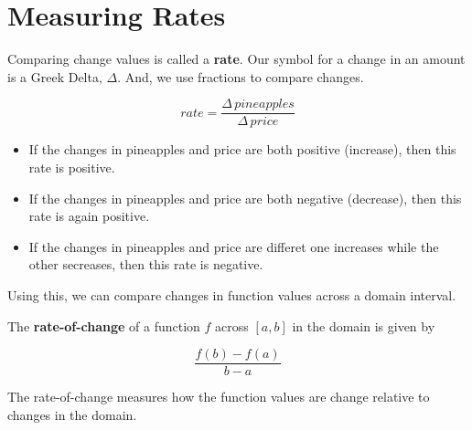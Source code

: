 \documentclass{ximera}
\begin{document}
\section{Measuring Rates}
Comparing change values is called a \textbf{rate}. Our symbol for a change in an amount is a Greek Delta, $\Delta$.  And, we use fractions to compare changes.

\[ rate = \frac{\Delta \, pineapples}{\Delta \, price}\]




\begin{itemize}
\item If the changes in pineapples and price are both positive (increase), then this rate is positive.
\item If the changes in pineapples and price are both negative (decrease), then this rate is again positive.
\item If the changes in pineapples and price are differet one increases while the other secreases, then this rate is negative.
\end{itemize}


Using this, we can compare changes in function values across a domain interval.


\begin{definition}
The \textbf{rate-of-change} of a function $f$ across $[a, b]$ in the domain is given by

\[  \frac{f(b) - f(a)}{b - a}  \]


\end{definition}

The rate-of-change measures how the function values are change relative to changes in the domain.
\end{document}
